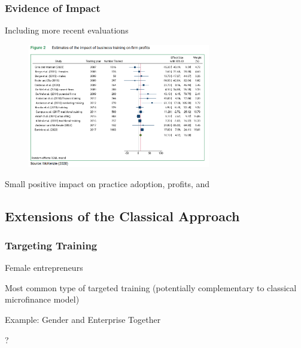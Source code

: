 \documentclass[hideothersubsections, usenames,dvipsnames,11pt]{beamer}
\newenvironment{itemize_2pt}{\itemize\addtolength{\itemsep}{2pt}}{\enditemize}
\begin{document}
\begin{frame}[label=McK2020_profits]
\frametitle{Evidence of Impact}
	
	Including more recent evaluations \citep{McKenzie2020}
	
\vspace{-0.5em}	
	
	\begin{figure}[htbp]
		\centering
		\includegraphics[width=21.5em]{pics/McK2020_profits.png}
		\label{McKenzie(2020): Profits}
	\end{figure}	
	
	\vspace{-1em}	
	
	\begin{itemize_2pt}
		\item Small positive impact on practice adoption, profits, and \hyperlink{McK2020_sales}{}
	\end{itemize_2pt}
	
	
\end{frame}


\subsection{Extensions of the Classical Approach}

\begin{frame}
\frametitle{Targeting Training}
	Female entrepreneurs
	\begin{itemize_2pt}
		\item \textcolor{bdf}{Most common type of targeted training} (potentially complementary to classical microfinance model)
		\item Example: Gender and Enterprise Together \citep[GET Ahead, ILO;][]{Bulte2016,McKenziePuerto2020}
		\item ?
	\vspace{0.1in}
	\end{itemize_2pt}
\end{frame}
\end{document}
